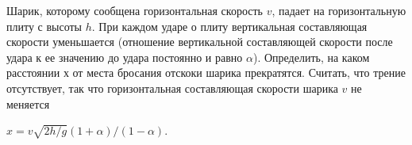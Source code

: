 \begin{ex} %
Шарик, которому сообщена горизонтальная скорость $v$, падает на горизонтальную плиту с высоты $h$. При каждом ударе о плиту вертикальная составляющая скорости уменьшается (отношение вертикальной составляющей скорости после удара к ее значению до удара
постоянно и равно $\alpha$). Определить, на каком расстоянии $х$ от места бросания отскоки шарика прекратятся. Считать, что трение отсутствует, так что горизонтальная составляющая скорости шарика $v$ не меняется
\begin{ans}
$x = v \sqrt{2h/g} \left( 1 + \alpha \right) / \left( 1 - \alpha \right)$.
\end{ans}
\end{ex}

\clearpage